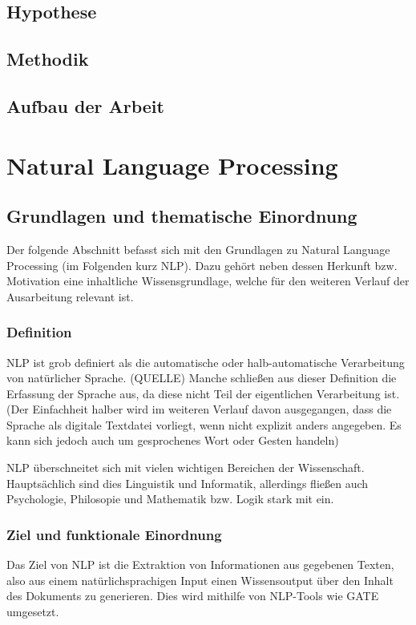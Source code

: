 \documentclass[12pt]{paper}
\begin{document}
\subsection{Hypothese}

\subsection{Methodik}

\subsection{Aufbau der Arbeit}

\section{Natural Language Processing}
\subsection{Grundlagen und thematische Einordnung}
Der folgende Abschnitt befasst sich mit den Grundlagen zu Natural Language Processing (im Folgenden kurz NLP). Dazu gehört neben dessen Herkunft bzw. Motivation eine inhaltliche Wissensgrundlage, welche für den weiteren Verlauf der Ausarbeitung relevant ist. 

\subsubsection{Definition}
NLP ist grob definiert als die automatische oder halb-automatische Verarbeitung von natürlicher Sprache. (QUELLE) Manche schließen aus dieser Definition die Erfassung der Sprache aus, da diese nicht Teil der eigentlichen Verarbeitung ist. (Der Einfachheit halber wird im weiteren Verlauf davon ausgegangen, dass die Sprache als digitale Textdatei vorliegt, wenn nicht explizit anders angegeben. Es kann sich jedoch auch um gesprochenes Wort oder Gesten handeln)

NLP überschneitet sich mit vielen wichtigen Bereichen der Wissenschaft. Hauptsächlich sind dies Linguistik und Informatik, allerdings fließen auch Psychologie, Philosopie und Mathematik bzw. Logik stark mit ein. 

\subsubsection{Ziel und funktionale Einordnung}
Das Ziel von NLP ist die Extraktion von Informationen aus gegebenen Texten, also aus einem natürlichsprachigen Input einen Wissensoutput über den Inhalt des Dokuments zu generieren. Dies wird mithilfe von NLP-Tools wie GATE umgesetzt.
\end{document}
